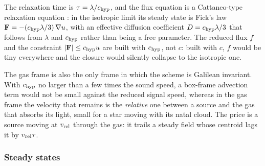 The relaxation time is $\tau = \lambda/c_{\rm hyp}$, and the flux equation
is a Cattaneo-type relaxation equation \citep{Cattaneo1958}: in the
isotropic limit its steady state is Fick's law $\mathbf F = -(c_{\rm
hyp}\lambda/3)\,\nabla u$, with an effective diffusion coefficient $D =
c_{\rm hyp}\lambda/3$ that follows from $\lambda$ and $c_{\rm hyp}$
rather than being a free parameter. The reduced flux $f$ and the
constraint $|\mathbf F|\le c_{\rm hyp}u$ are built with $c_{\rm hyp}$, not
$c$: built with $c$, $f$ would be tiny everywhere and the closure would
silently collapse to the isotropic one.

The gas frame is also the only frame in which the scheme is Galilean
invariant. With $c_{\rm hyp}$ no larger than a few times the sound speed,
a box-frame advection term would not be small against the reduced signal
speed, whereas in the gas frame the velocity that remains is the
\emph{relative} one between a source and the gas that absorbs its light,
small for a star moving with its natal cloud. The price is a source moving
at $v_{\rm rel}$ through the gas: it trails a steady field whose centroid
lags it by $v_{\rm rel}\tau$.

\subsubsection{Steady states}
\label{sec:fuv-steady}

